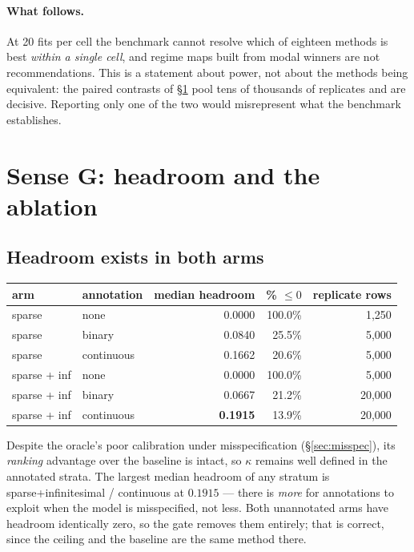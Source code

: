 \documentclass[11pt,a4paper]{article}
\begin{document}
\paragraph{What follows.} At 20 fits per cell the benchmark cannot resolve which
of eighteen methods is best \emph{within a single cell}, and regime maps built
from modal winners are not recommendations. This is a statement about power, not
about the methods being equivalent: the paired contrasts of
\S\ref{sec:senseg} pool tens of thousands of replicates and are decisive.
Reporting only one of the two would misrepresent what the benchmark establishes.

\section{Sense G: headroom and the ablation}\label{sec:senseg}



\subsection{Headroom exists in both arms}\label{sec:headroom}

\begin{center}\small
\begin{tabular}{llrrr}\toprule
arm & annotation & median headroom & \% $\le0$ & replicate rows\\\midrule
sparse & none & 0.0000 & 100.0\% & 1{,}250\\
sparse & binary & 0.0840 & 25.5\% & 5{,}000\\
sparse & continuous & 0.1662 & 20.6\% & 5{,}000\\
sparse + inf & none & 0.0000 & 100.0\% & 5{,}000\\
sparse + inf & binary & 0.0667 & 21.2\% & 20{,}000\\
sparse + inf & continuous & \textbf{0.1915} & 13.9\% & 20{,}000\\
\bottomrule\end{tabular}\end{center}

Despite the oracle's poor calibration under misspecification
(\S\ref{sec:misspec}), its \emph{ranking} advantage over the baseline is intact,
so $\kappa$ remains well defined in the annotated strata. The largest median
headroom of any stratum is sparse+infinitesimal / continuous at $0.1915$ ---
there is \emph{more} for annotations to exploit when the model is misspecified,
not less. Both unannotated arms have headroom identically zero, so the gate
removes them entirely; that is correct, since the ceiling and the baseline are
the same method there.
\end{document}
